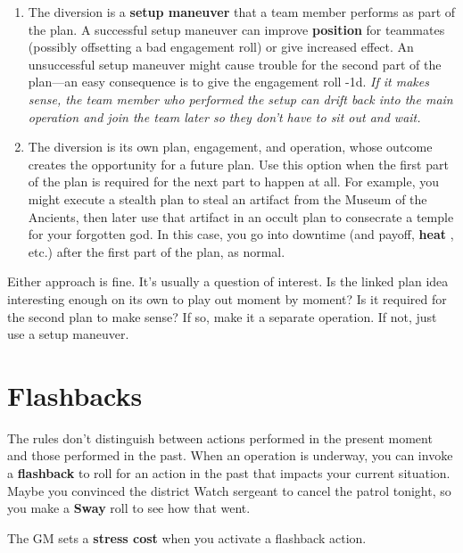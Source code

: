 \documentclass[11pt,oneside]{book}
\newcommand{\gameterm}[1]{\textbf{#1}}
\begin{document}
\begin{enumerate}
	\item The diversion is a \textbf{setup maneuver} that a team member performs as part of the plan. A successful setup maneuver can improve \textbf{position} for teammates (possibly offsetting a bad engagement roll) or give increased effect.  An unsuccessful setup maneuver might cause trouble for the second part of the plan---an easy consequence is to give the engagement roll -1d. \emph{If it makes sense, the team member who performed the setup can drift back into the main operation and join the team later so they don’t have to sit out and wait.}
	\item The diversion is its own plan, engagement, and operation, whose outcome creates the opportunity for a future plan. Use this option when the first part of the plan is required for the next part to happen at all. For example, you might execute a stealth plan to steal an artifact from the Museum of the Ancients, then later use that artifact in an occult plan to consecrate a temple for your forgotten god. In this case, you go into downtime (and payoff, \gameterm{heat} , etc.) after the first part of the plan, as normal.
\end{enumerate}

Either approach is fine. It’s usually a question of interest. Is the linked plan idea interesting enough on its own to play out moment by moment? Is it required for the second plan to make sense? If so, make it a separate operation. If not, just use a setup maneuver.

\section{Flashbacks}

The rules don’t distinguish between actions performed in the present moment and those performed in the past. When an operation is underway, you can invoke a \textbf{flashback} to roll for an action in the past that impacts your current situation. Maybe you convinced the district Watch sergeant to cancel the patrol tonight, so you make a \gameterm{Sway}  roll to see how that went.

The GM sets a \textbf{stress cost} when you activate a flashback action.
\end{document}
